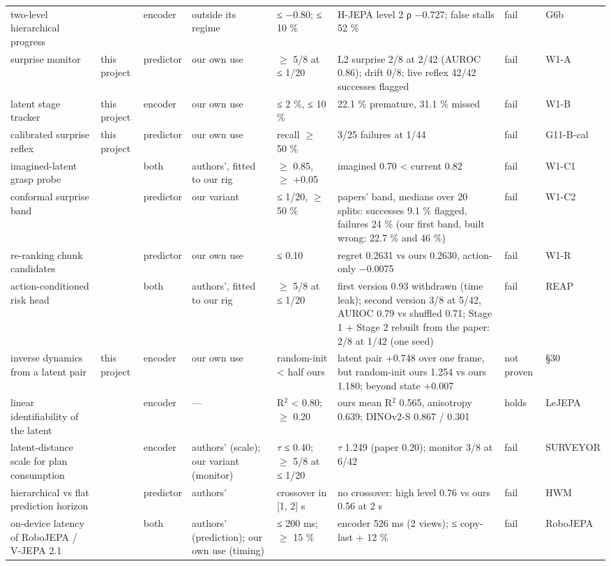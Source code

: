 \documentclass[10pt,twocolumn]{article}
\begin{document}
\begin{table}[!t]
\begin{tabular}{>{\raggedright}p{2.2cm}>{\raggedright}p{1.0cm}p{1.2cm}>{\raggedright}p{1.6cm}>{\raggedright}p{2.0cm}>{\raggedright}p{4.0cm}>{\raggedright}p{1.6cm}p{1.1cm}}
\rowcolor{shissofail}two-level hierarchical progress & \citep{zhang2026hjepa} & encoder & outside its regime & ≤ −0.80; ≤ 10 \% & H-JEPA level 2 ρ −0.727; false stalls 52 \% & fail & G6b \tabularnewline
\rowcolor{shissofail}surprise monitor & this project & predictor & our own use & $\geq$ 5/8 at ≤ 1/20 & L2 surprise 2/8 at 2/42 (AUROC 0.86); drift 0/8; live reflex 42/42 successes flagged & fail & W1-A \tabularnewline
\rowcolor{shissofail}latent stage tracker & this project & encoder & our own use & ≤ 2 \%, ≤ 10 \% & 22.1 \% premature, 31.1 \% missed & fail & W1-B \tabularnewline
\rowcolor{shissofail}calibrated surprise reflex & this project & predictor & our own use & recall $\geq$ 50 \% & 3/25 failures at 1/44 & fail & G11-B-cal \tabularnewline
\rowcolor{shissofail}imagined-latent grasp probe & \citep{zheng2026contactguard} & both & authors', fitted to our rig & $\geq$ 0.85, $\geq$ +0.05 & imagined 0.70 < current 0.82 & fail & W1-C1 \tabularnewline
\rowcolor{shissofail}conformal surprise band & \citep{xu2025faildetect,gu2025safe} & predictor & our variant & ≤ 1/20, $\geq$ 50 \% & papers' band, medians over 20 splits: successes 9.1 \% flagged, failures 24 \% (our first band, built wrong: 22.7 \% and 46 \%) & fail & W1-C2 \tabularnewline
\rowcolor{shissofail}re-ranking chunk candidates & \citep{maes2026lewm} & predictor & our own use & ≤ 0.10 & regret 0.2631 vs ours 0.2630, action-only −0.0075 & fail & W1-R \tabularnewline
\rowcolor{shissofail}action-conditioned risk head & \citep{liu2026reap} & both & authors', fitted to our rig & $\geq$ 5/8 at ≤ 1/20 & first version 0.93 withdrawn (time leak); second version 3/8 at 5/42, AUROC 0.79 vs shuffled 0.71; Stage 1 + Stage 2 rebuilt from the paper: 2/8 at 1/42 (one seed) & fail & REAP \tabularnewline
\rowcolor{shissoamber}inverse dynamics from a latent pair & this project & encoder & our own use & random-init < half ours & latent pair +0.748 over one frame, but random-init ours 1.254 vs ours 1.180; beyond state +0.007 & not proven & §30 \tabularnewline
\rowcolor{shissopass}linear identifiability of the latent & \citep{klindt2026lejepa} & encoder & --- & R$^2$ < 0.80; $\geq$ 0.20 & ours mean R$^2$ 0.565, anisotropy 0.639; DINOv2-S 0.867 / 0.301 & holds & LeJEPA \tabularnewline
\rowcolor{shissofail}latent-distance scale for plan consumption & \citep{surveyor2026} & encoder & authors' (scale); our variant (monitor) & $\tau$ ≤ 0.40; $\geq$ 5/8 at ≤ 1/20 & $\tau$ 1.249 (paper 0.20); monitor 3/8 at 6/42 & fail & SURVEYOR \tabularnewline
\rowcolor{shissofail}hierarchical vs flat prediction horizon & \citep{zhang2026hwm} & predictor & authors' & crossover in [1, 2] s & no crossover: high level 0.76 vs ours 0.56 at 2 s & fail & HWM \tabularnewline
\rowcolor{shissofail}on-device latency of RoboJEPA / V-JEPA 2.1 & \citep{zholus2026robojepa,murlabadia2026vjepa21} & both & authors' (prediction); our own use (timing) & ≤ 200 ms; $\geq$ 15 \% & encoder 526 ms (2 views); ≤ copy-last + 12 \% & fail & RoboJEPA \tabularnewline
\bottomrule
\end{tabular}
\end{table}
\end{document}
